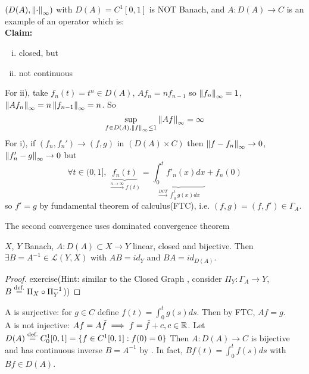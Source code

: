 \documentclass{article}
\begin{document}
\begin{example}\nl
	$(D(A),\left\|{\cdot}\right\|_\infty)$ with $D(A)=C^1[0,1]$ is NOT Banach, and $A:D(A)\to C$ is an example of an operator which is:\\
	\textbf{Claim: }\\
             \begin{enumerate}[i)]
                 \item closed, but
                 \item not continuous
             \end{enumerate}
	For ii), take $f_n(t)=t^n\in D(A)$, $Af_n=nf_{n-1}$ so $\left\|{f_n}\right\|_\infty=1$, $\left\|{Af_n}\right\|_\infty=n\left\|{f_{n-1}}\right\|_\infty=n$. So 
	$$ \sup_{f\in D(A),\left\|{f}\right\|_\infty\leq1}\left\|{Af}\right\|_\infty=\infty$$
	For i), if $(f_n,f_n')\to(f,g)$ in $(D(A)\times C)$ then $\left\|{f-f_n}\right\|_\infty\to 0$, $\left\|{f_n'-g}\right\|_\infty\to0$ but
	$$
	\forall t\in(0,1],\,\underbrace{f_n(t)}_{\overset{n\to\infty}{\longrightarrow}f(t)}
	=\underbrace{\int_0^t f'_n(x) dx}_{\overset{DCT}{\longrightarrow}\int_0^t g(x) dx}
	+f_n(0)
	$$
	so $f'=g$ by fundamental theorem of calculus(FTC), i.e. $(f,g)=(f,f')\in\Gamma_A$. 
 \begin{unexaminable}
The second convergence uses dominated convergence theorem
 \end{unexaminable}
\end{example}


\begin{corollary}\nl
\label{corollary: continuous inverse}
	$X$, $Y$ Banach, $A:D(A)\subset X\to Y$ linear, closed and bijective. Then $\exists B=A^{-1}\in\mathcal{L}(Y,X)$ with $AB=id_Y$ and $BA=id_{D(A)}$. 
\end{corollary}
\begin{proof}
    exercise(Hint: similar to the Closed Graph , consider $\Pi_Y:\Gamma_A\to Y$, $B\stackrel{\text{def.}}{=}\Pi_X\circ \Pi_Y^{-1}$))
\end{proof}

\begin{example}\nl
	A is surjective: for $g\in C$ define $f(t)=\int_0^t g(s) ds$. Then by FTC, $Af=g$.\\
	A is not injective: $Af=A\tilde{f}\implies f=\tilde{f}+c,c\in\mathbb{R}$. 
	Let $D(A)\stackrel{\text{def.}}{=} C_0^1[0,1]=\{f\in C^1[0,1]:f(0)=0\}$
	Then $A:D(A)\to C$ is bijective and has continuous inverse $B=A^{-1}$ by . In fact, $Bf(t)=\int_0^tf(s)ds$ with $Bf\in D(A)$.
\end{example}
\end{document}
